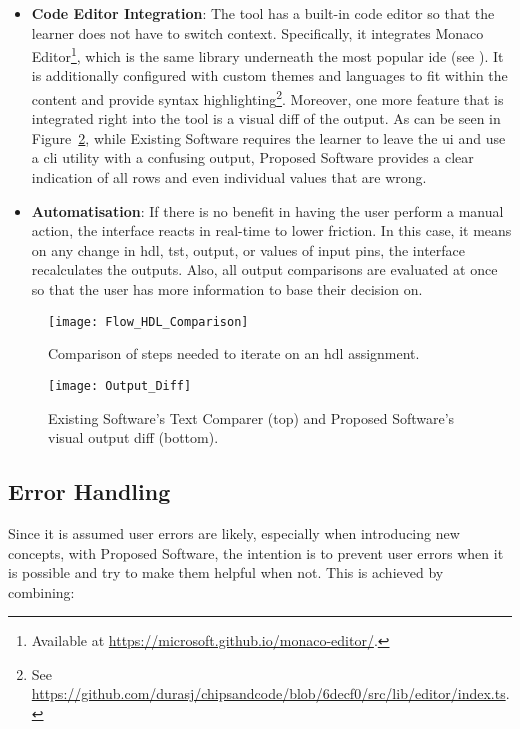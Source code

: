 \begin{itemize}
    \item \textbf{Code Editor Integration}: The tool has a built-in code editor so that the learner does not have to switch context. Specifically, it integrates Monaco Editor\footnote{Available at \url{https://microsoft.github.io/monaco-editor/}.}, which is the same library underneath the most popular \gls{ide} (see ). It is additionally configured with custom themes and languages to fit within the content and provide syntax highlighting\footnote{See \url{https://github.com/durasj/chipsandcode/blob/6decf0/src/lib/editor/index.ts}.}. Moreover, one more feature that is integrated right into the tool is a visual diff of the output. As can be seen in Figure~\ref{fig:design-diff}, while Existing Software requires the learner to leave the \gls{ui} and use a \gls{cli} utility with a confusing output, Proposed Software provides a clear indication of all rows and even individual values that are wrong.
    \item \textbf{Automatisation}: If there is no benefit in having the user perform a manual action, the interface reacts in real-time to lower friction. In this case, it means on any change in \gls{hdl}, \gls{tst}, output, or values of input pins, the interface recalculates the outputs. Also, all output comparisons are evaluated at once so that the user has more information to base their decision on.
\end{itemize}

\begin{figure}[H]
    \centering
    \texttt{[image: Flow\_HDL\_Comparison]}
    \caption{Comparison of steps needed to iterate on an \gls{hdl} assignment.}
    \label{fig:design-hdl-steps}
\end{figure}

\begin{figure}[H]
    \centering
    \texttt{[image: Output\_Diff]}
    \caption{Existing Software's Text Comparer (top) and Proposed Software's visual output diff (bottom).}
    \label{fig:design-diff}
\end{figure}

\subsection{Error Handling}
\label{sec:ui-error-handling}

Since it is assumed user errors are likely, especially when introducing new concepts, with Proposed Software, the intention is to prevent user errors when it is possible and try to make them helpful when not.
This is achieved by combining:


